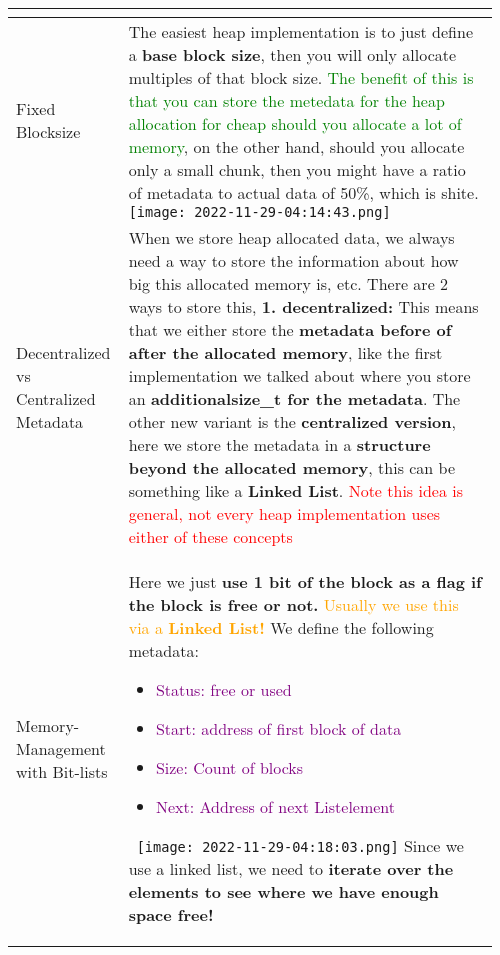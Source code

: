 \documentclass[main.tex,fontsize=8pt,paper=a4,paper=portrait,DIV=calc,]{scrartcl}
\begin{document}
\begin{table}[ht!]
\begin{tabular}{|m{0.2\linewidth}|m{0.755\linewidth}|}
\begin{itemize}
\vspace{-3mm}
\end{itemize}\\ 
\hline
Fixed Blocksize & 
The easiest heap implementation is to just define a \textbf{base block size}, then you will only allocate multiples of that block size.\newline
\textcolor{green}{The benefit of this is that you can store the metedata for the heap allocation for cheap should you allocate a lot of memory}, on the other hand, should you allocate only a small chunk, then you might have a ratio of metadata to actual data of 50\%, which is shite.\newline
\texttt{[image: 2022-11-29-04:14:43.png]} \newline
\\
\hline
Decentralized vs Centralized Metadata & 
When we store heap allocated data, we always need a way to store the information about how big this allocated memory is, etc.\newline
There are 2 ways to store this, \textbf{1. decentralized:}\newline
This means that we either store the \textbf{metadata before of after the allocated memory}, like the first implementation we talked about where you store an \textbf{additionalsize\_t for the metadata}.\newline
The other new variant is the \textbf{centralized version}, here we store the metadata in a \textbf{structure beyond the allocated memory}, this can be something like a \textbf{Linked List}. \newline
\textcolor{red}{Note this idea is general, not every heap implementation uses either of these concepts}\\
\hline
Memory-Management with Bit-lists & 
Here we just \textbf{use 1 bit of the block as a flag if the block is free or not.}\newline
\textcolor{orange}{Usually we use this via a \textbf{Linked List!}}\newline
We define the following metadata:\newline
\begin{itemize}
\item \textcolor{purple}{Status: free or used}
\item \textcolor{purple}{Start: address of first block of data}
\item \textcolor{purple}{Size: Count of blocks}
\item \textcolor{purple}{Next: Address of next Listelement}
\end{itemize} 
\, \newline
\texttt{[image: 2022-11-29-04:18:03.png]}\newline
Since we use a linked list, we need to \textbf{iterate over the elements to see where we have enough space free!}\\
\hline
\end{tabular}
\end{table}
\end{document}
